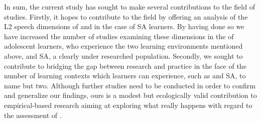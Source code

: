\documentclass[output=paper]{langsci/langscibook}
\begin{document}
In sum, the current study has sought to make several contributions to the field of  studies. Firstly, it hopes to contribute to the field by offering an analysis of  the {L2} speech dimensions of  and  in the case of SA  learners. By having done so we have increased the number of studies examining these dimensions in the  of adolescent  learners, who experience the two learning environments mentioned above,  and SA, a clearly under researched population. Secondly, we sought to contribute to bridging the gap between research and  practice in the face of the number of learning contexts which learners can experience, such as  and SA, to name but two. Although further studies need to be conducted in order to confirm and generalize our findings, ours is a modest but ecologically valid contribution to empirical-based research aiming at exploring what really happens with regard to the assessment of .

 
\sloppy
\printbibliography[heading=subbibliography,notkeyword=this] 
\end{document}
